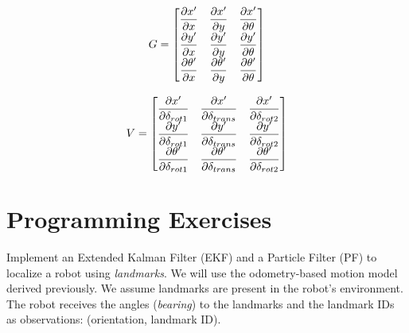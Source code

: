 \documentclass[tp]{lcc}
\begin{document}
    \noindent
    \begin{minipage}[t]{.5\textwidth}
    \begin{equation*}
        G =
        \begin{bmatrix}
            \dfrac{\partial x^{\prime}}{\partial x} & \dfrac{\partial x^{\prime}}{\partial y} & \dfrac{\partial x^{\prime}}{\partial \theta}\\
            \dfrac{\partial y^{\prime}}{\partial x} & \dfrac{\partial y^{\prime}}{\partial y} & \dfrac{\partial y^{\prime}}{\partial \theta}\\
            \dfrac{\partial \theta^{\prime}}{\partial x} & \dfrac{\partial \theta^{\prime}}{\partial y} & \dfrac{\partial \theta^{\prime}}{\partial \theta}
        \end{bmatrix}
\end{equation*}
    \end{minipage}%
    \begin{minipage}[t]{.5\textwidth}
        \begin{equation*}
            V =
            \begin{bmatrix}
                \dfrac{\partial x^{\prime}}{\partial \delta_{rot1}} & \dfrac{\partial x^{\prime}}{\partial \delta_{trans}} & \dfrac{\partial x^{\prime}}{\partial \delta_{rot2}}\\
                \dfrac{\partial y^{\prime}}{\partial \delta_{rot1}} & \dfrac{\partial y^{\prime}}{\partial \delta_{trans}} & \dfrac{\partial y^{\prime}}{\partial \delta_{rot2}}\\
                \dfrac{\partial \theta^{\prime}}{\partial \delta_{rot1}} & \dfrac{\partial \theta^{\prime}}{\partial \delta_{trans}} & \dfrac{\partial \theta^{\prime}}{\partial \delta_{rot2}}
            \end{bmatrix}
        \end{equation*}
    \end{minipage}
    
	
\section{Programming Exercises}

Implement an Extended Kalman Filter (EKF) and a Particle Filter (PF) to localize a robot using \emph{landmarks}. We will use the odometry-based motion model derived previously. We assume landmarks are present in the robot's environment. The robot receives the angles (\emph{bearing}) to the landmarks and the landmark IDs as observations: (orientation, landmark ID).
\end{document}
